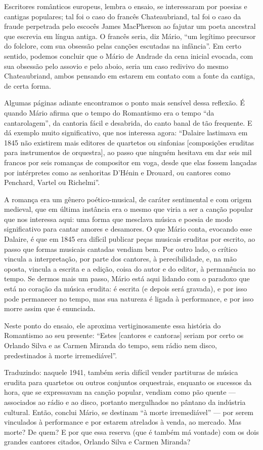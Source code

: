 Escritores românticos europeus, lembra o ensaio, se interessaram por
poesias e cantigas populares; tal foi o caso do francês Chateaubriand,
tal foi o caso da fraude perpetrada pelo escocês James MacPherson ao
fajutar um poeta ancestral que escrevia em língua antiga. O francês
seria, diz Mário, ``um legítimo precursor do folclore, com sua obsessão
pelas canções escutadas na infância''. Em certo sentido, podemos
concluir que o Mário de Andrade da cena inicial evocada, com sua
obsessão pelo assovio e pelo aboio, seria um caso redivivo do mesmo
Chateaubriand, ambos pensando em estarem em contato com a fonte da
cantiga, de certa forma.

Algumas páginas adiante encontramos o ponto mais sensível dessa
reflexão. É quando Mário afirma que o tempo do Romantismo era o tempo
``da cantarolagem'', da cantoria fácil e desabrida, do canto banal de
tão frequente. E dá exemplo muito significativo, que nos interessa
agora: ``Dalaire lastimava em 1845 não existirem mais editores de
quartetos ou sinfonias {[}composições eruditas para instrumentos de
orquestra{]}, ao passo que ninguém hesitava em dar seis mil francos por
seis romanças de compositor em voga, desde que elas fossem lançadas por
intérpretes como as senhoritas D'Hénin e Drouard, ou cantores como
Penchard, Vartel ou Richelmi''.

A romança era um gênero poético-musical, de caráter sentimental e com
origem medieval, que em última instância era o mesmo que viria a ser a
canção popular que nos interessa aqui: uma forma que mesclava música e
poesia de modo significativo para cantar amores e desamores. O que Mário
conta, evocando esse Dalaire, é que em 1845 era difícil publicar peças
musicais eruditas por escrito, ao passo que formas musicais cantadas
vendiam bem. Por outro lado, o crítico vincula a interpretação, por
parte dos cantores, à perecibilidade, e, na mão oposta, vincula a
escrita e a edição, coisa do autor e do editor, à permanência no tempo.
Se dermos mais um passo, Mário está aqui lidando com o paradoxo que está
no coração da música erudita: é escrita (e depois será gravada), e por
isso pode permanecer no tempo, mas sua natureza é ligada à performance,
e por isso morre assim que é enunciada.

Neste ponto do ensaio, ele aproxima vertiginosamente essa história do
Romantismo ao seu presente: ``Estes {[}cantores e cantoras{]} seriam por
certo os Orlando Silva e as Carmen Miranda do tempo, sem rádio nem
disco, predestinados à morte irremediável''.

Traduzindo: naquele 1941, também seria difícil vender partituras de
música erudita para quartetos ou outros conjuntos orquestrais, enquanto
os sucessos da hora, que se expressavam na canção popular, vendiam como
pão quente --- associados ao rádio e ao disco, portanto mergulhados no
pântano da indústria cultural. Então, conclui Mário, se destinam ``à
morte irremediável'' --- por serem vinculados à performance e por estarem
atrelados à venda, ao mercado. Mas morte? De quem? E por que essa
reserva (que é também má vontade) com os dois grandes cantores citados,
Orlando Silva e Carmen Miranda?

